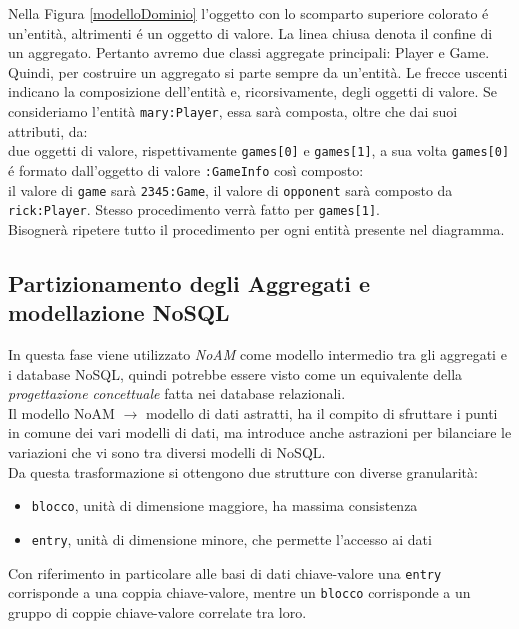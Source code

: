 Nella Figura \ref{modelloDominio} l'oggetto con lo scomparto superiore colorato é un'entità, altrimenti
é un oggetto di valore. La linea chiusa denota il confine di un aggregato.
Pertanto avremo due classi aggregate principali: Player e Game.\\
Quindi, per costruire un aggregato si parte sempre da un'entità.
Le frecce uscenti indicano la composizione dell'entità e, ricorsivamente, degli oggetti di valore.
Se consideriamo l'entità \texttt{mary:Player}, essa sarà composta, oltre che dai suoi attributi, da:\\
due oggetti di valore, rispettivamente \texttt{games[0]} e \texttt{games[1]}, a sua volta \texttt{games[0]} é formato dall'oggetto
di valore \texttt{:GameInfo} così composto:\\
il valore di \texttt{game} sarà \texttt{2345:Game}, il valore di \texttt{opponent} sarà composto da \texttt{rick:Player}.
Stesso procedimento verrà fatto per \texttt{games[1]}.\\
Bisognerà ripetere tutto il procedimento per ogni entità presente nel diagramma.


\subsection{Partizionamento degli Aggregati e modellazione NoSQL}
In questa fase viene utilizzato \emph{NoAM} come modello intermedio tra gli aggregati e i database NoSQL, quindi potrebbe
essere visto come un equivalente della \emph{progettazione concettuale} fatta nei database relazionali.\\
Il modello NoAM $\to$ modello di dati astratti, ha il compito di sfruttare i punti in comune dei vari modelli di dati, ma
introduce anche astrazioni per bilanciare le variazioni che vi sono tra diversi modelli di NoSQL.\\
Da questa trasformazione si ottengono due strutture con diverse granularità:\\
\begin{itemize}
    \item \texttt{blocco}, unità di dimensione maggiore, ha massima consistenza
    \item \texttt{entry}, unità di dimensione minore, che permette l'accesso ai dati
\end{itemize}
Con riferimento in particolare alle basi di dati chiave-valore una \texttt{entry} corrisponde a una coppia chiave-valore, mentre
un \texttt{blocco} corrisponde a un gruppo di coppie chiave-valore correlate tra loro.


